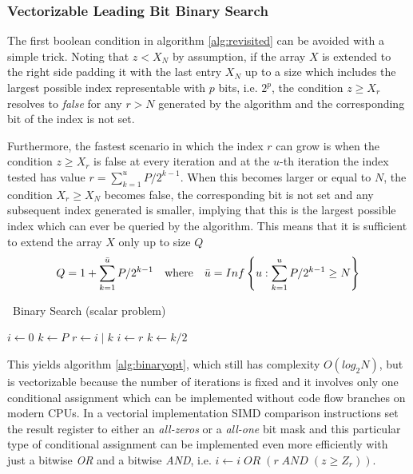 \documentclass[preprint,1p,times]{elsarticle}
\begin{document}
\subsubsection{Vectorizable Leading Bit Binary Search}
\label{sec:leadbit}
The first boolean condition in algorithm \ref{alg:revisited} can be avoided with a simple trick.
Noting that $z<X_N$ by assumption, if the array $X$ is extended to the right side padding 
it with the last entry $X_N$ up to a size which includes the largest possible index representable with $p$ bits, i.e. $2^p$, the condition $z \geq X_{r}$ resolves to \textit{false} for any $r>N$ generated by the algorithm and the corresponding bit of the index is not set.

Furthermore, the fastest scenario in which the index $r$ can grow is when the condition $z \geq X_{r}$ is false at every iteration and at the $u$-th iteration the index tested has value $r=\sum_{k=1}^u P/2^{k-1}$. When this becomes larger or equal to $N$, the condition $X_r \geq X_N$ becomes false, the corresponding bit is not set and any subsequent index generated is smaller, implying that this is the largest possible index which can ever be queried by the algorithm. 
This means that it is sufficient to extend the array $X$ only up to size $Q$
$$Q=1+\sum_{k=1}^{\bar{u}} P/2^{k-1}\quad\text{where}\quad\bar{u}=Inf \left \{ u: \sum_{k=1}^u P/2^{k-1} \geq N \right \}$$

\begin{algorithm}[ht]
	\caption{\BitSetName\  Binary Search (scalar problem)}
	\label{alg:binaryopt}
	\begin{algorithmic}
		 
		\State $i \leftarrow 0$
		\State $k \leftarrow P$
		\Repeat
		\State $r \leftarrow i\;|\;k$ 
		\State $i \leftarrow r$    
		\EndIf
		\State $k \leftarrow k / 2$ 
		\EndFunction
	\end{algorithmic}
\end{algorithm}

This yields algorithm \ref{alg:binaryopt}, which still has complexity $O(log_2N)$, but is vectorizable because the number of iterations is fixed and it involves only one conditional assignment which can be implemented without code flow branches on modern CPUs. In a vectorial implementation SIMD comparison instructions set the result register to either an \textit{all-zeros} or a \textit{all-one} bit mask and this particular type of conditional assignment can be implemented even more efficiently with just a bitwise \textit{OR} and a bitwise \textit{AND}, i.e. $i \leftarrow i \; OR \; (r \; AND \; (z \geq Z_r))$.
\end{document}
